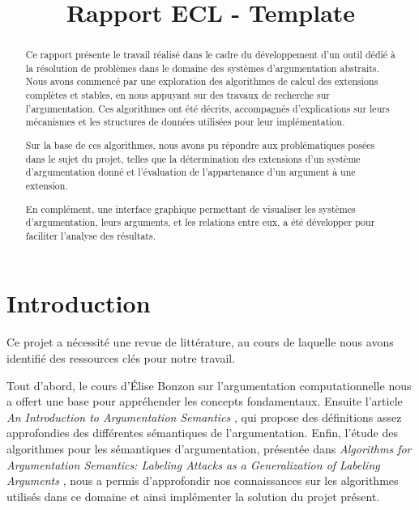 \documentclass{rapportECL}
\title{Rapport ECL - Template} %
\begin{document}




        
\fairemarges %
\fairepagedegarde %
\tabledematieres %

\begin{abstract}
	Ce rapport présente le travail réalisé dans le cadre du développement d’un outil dédié à la résolution de problèmes 
	dans le domaine des systèmes d’argumentation abstraits. Nous avons commencé par une exploration des algorithmes de 
	calcul des extensions complètes et stables, en nous appuyant sur des travaux de recherche sur l’argumentation. Ces 
	algorithmes ont été décrits, accompagnés d’explications sur leurs mécanismes et les structures 
	de données utilisées pour leur implémentation.

    Sur la base de ces algorithmes, nous avons pu répondre aux problématiques posées dans le sujet du projet, telles que la détermination 
	des extensions d’un système d’argumentation donné et l’évaluation de l’appartenance d’un argument à une extension.

    En complément, une interface graphique permettant de visualiser les systèmes d’argumentation, 
	leurs arguments, et les relations entre eux, a été développer pour faciliter l’analyse des résultats. 
\end{abstract}

\newpage %


\section{Introduction} 
Ce projet a nécessité une revue de littérature, au cours de laquelle nous avons identifié des ressources clés pour notre travail.


Tout d'abord, le cours d'Élise Bonzon sur l'argumentation computationnelle \cite{a} nous a offert une base pour appréhender les concepts fondamentaux. 
Ensuite l'article \textit{An Introduction to Argumentation Semantics} \cite{b}, qui propose des définitions assez approfondies des différentes sémantiques de l'argumentation. 
Enfin, l’étude des algorithmes pour les sémantiques d'argumentation, présentée dans \textit{Algorithms for Argumentation Semantics: Labeling Attacks as a Generalization of Labeling Arguments} \cite{c}, 
nous a permis d’approfondir nos connaissances sur les algorithmes utilisés dans ce domaine et ainsi implémenter la solution du projet présent. 
\end{document}

